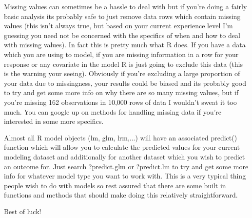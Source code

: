 \documentclass[00-GLMregression.tex]{subfiles}
\begin{document}
Missing values can sometimes be a hassle to deal with but if you're doing a fairly basic analysis its probably safe to just remove data rows which contain missing values (this isn't always true, but based on your current experience level I'm guessing you need not be concerned with the specifics of when and how to deal with missing values). In fact this is pretty much what R does. If you have a data which you are using to model, if you are missing information in a row for your response or any covariate in the model R is just going to exclude this data (this is the warning your seeing). Obviously if you're excluding a large proportion of your data due to missingness, your results could be biased and its probably good to try and get some more info on why there are so many missing values, but if you're missing 162 observations in 10,000 rows of data I wouldn't sweat it too much. You can google up on methods for handling missing data if you're interested in some more specifics.

Almost all R model objects (lm, glm, lrm,...) will have an associated predict() function which will allow you to calculate the predicted values for your current modeling dataset and additionally for another dataset which you wish to predict an outcome for. Just search ?predict.glm or ?predict.lm to try and get some more info for whatever model type you want to work with. This is a very typical thing people wish to do with models so rest assured that there are some built in functions and methods that should make doing this relatively straightforward.

Best of luck!
	

\end{document}
